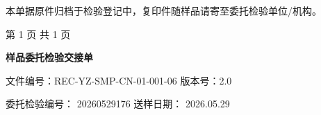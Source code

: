 \documentclass[UTF8,10pt,a4paper,fontset=fandol]{ctexart}
\newcommand{\fieldvalue}[1]{#1}
\begin{document}
\vspace{0.6em}

{\footnotesize *本单据原件归档于检验登记中，复印件随样品请寄至委托检验单位/机构。}

\vfill

\begin{center}
{\footnotesize 第 1 页 共 1 页}
\end{center}

\newpage


\begin{center}
{\large \textbf{样品委托检验交接单}}
\end{center}

\noindent
文件编号：REC-YZ-SMP-CN-01-001-06 \qquad 版本号：2.0

\noindent
委托检验编号：
\fieldvalue{20260529176}
\hfill
送样日期：
\fieldvalue{2026.05.29}

\vspace{0.5em}
\end{document}

